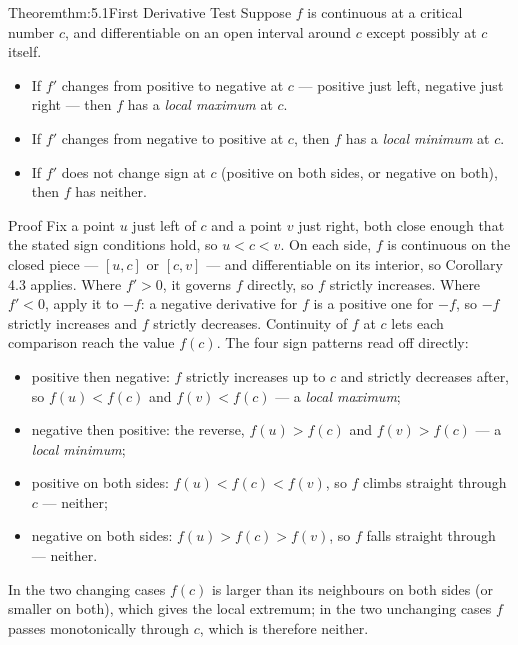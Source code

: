 \documentclass[a4paper,12pt,oneside]{memoir}
\begin{document}
\begin{envtheorem}{Theorem}{thm:5.1}{First Derivative Test}
Suppose \(f\) is continuous at a critical number \(c\), and differentiable on an open interval around \(c\) except possibly at \(c\) itself.

\begin{itemize}
  \item If \(f'\) changes from positive to negative at \(c\) — positive just left, negative just right — then \(f\) has a \emph{local maximum} at \(c\).
  \item If \(f'\) changes from negative to positive at \(c\), then \(f\) has a \emph{local minimum} at \(c\).
  \item If \(f'\) does not change sign at \(c\) (positive on both sides, or negative on both), then \(f\) has neither.
\end{itemize}
\end{envtheorem}
\begin{envproof}{Proof}{}{}
Fix a point \(u\) just left of \(c\) and a point \(v\) just right, both close enough that the stated sign conditions hold, so \(u < c < v\). On each side, \(f\) is continuous on the closed piece — \([u, c]\) or \([c, v]\) — and differentiable on its interior, so Corollary 4.3 applies. Where \(f' > 0\), it governs \(f\) directly, so \(f\) strictly increases. Where \(f' < 0\), apply it to \(-f\): a negative derivative for \(f\) is a positive one for \(-f\), so \(-f\) strictly increases and \(f\) strictly decreases. Continuity of \(f\) at \(c\) lets each comparison reach the value \(f(c)\). The four sign patterns read off directly:

\begin{itemize}
  \item positive then negative: \(f\) strictly increases up to \(c\) and strictly decreases after, so \(f(u) < f(c)\) and \(f(v) < f(c)\) — a \emph{local maximum};
  \item negative then positive: the reverse, \(f(u) > f(c)\) and \(f(v) > f(c)\) — a \emph{local minimum};
  \item positive on both sides: \(f(u) < f(c) < f(v)\), so \(f\) climbs straight through \(c\) — neither;
  \item negative on both sides: \(f(u) > f(c) > f(v)\), so \(f\) falls straight through — neither.
\end{itemize}
In the two changing cases \(f(c)\) is larger than its neighbours on both sides (or smaller on both), which gives the local extremum; in the two unchanging cases \(f\) passes monotonically through \(c\), which is therefore neither. \qedmark
\end{envproof}
\end{document}
